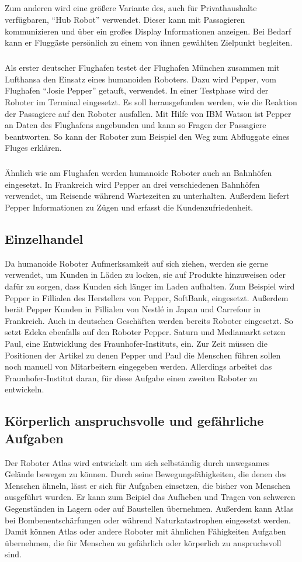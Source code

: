\subparagraph{}
Zum anderen wird eine größere Variante des, auch für Privathaushalte
verfügbaren, "`Hub Robot"' verwendet. Dieser kann mit Passagieren kommunizieren
und über ein großes Display Informationen anzeigen. Bei Bedarf kann er Fluggäste
persönlich zu einem von ihnen gewählten Zielpunkt begleiten.
\cite{Beineke2017}

\subparagraph{}
Als erster deutscher Flughafen testet der Flughafen München zusammen mit
Lufthansa den Einsatz eines humanoiden Roboters. Dazu wird Pepper, vom Flughafen
"`Josie Pepper"' getauft, verwendet. In einer Testphase wird der Roboter im
Terminal eingesetzt. Es soll herausgefunden werden, wie die Reaktion der
Passagiere auf den Roboter ausfallen. Mit Hilfe von IBM Watson ist Pepper an
Daten des Flughafens angebunden und kann so Fragen der Passagiere beantworten.
So kann der Roboter zum Beispiel den Weg zum Abfluggate eines Fluges erklären.
\cite{MunichAirport2018}

\subparagraph{}
Ähnlich wie am Flughafen werden humanoide Roboter auch an Bahnhöfen eingesetzt.
In Frankreich wird Pepper an drei verschiedenen Bahnhöfen verwendet, um Reisende
während Wartezeiten zu unterhalten. Außerdem liefert Pepper Informationen zu
Zügen und erfasst die Kundenzufriedenheit. \cite{SoftBankIV2018}

\subsection{Einzelhandel}
Da humanoide Roboter Aufmerksamkeit auf sich ziehen, werden sie gerne verwendet,
um Kunden in Läden zu locken, sie auf Produkte hinzuweisen oder dafür zu sorgen,
dass Kunden sich länger im Laden aufhalten. Zum Beispiel wird Pepper in
Fillialen des Herstellers von Pepper, SoftBank, eingesetzt. Außerdem berät
Pepper Kunden in Fillialen von Nestlé in Japan und Carrefour in Frankreich.
\cite{SoftBankIV2018} Auch in deutschen Geschäften werden bereits Roboter
eingesetzt. So setzt Edeka ebenfalls auf den Roboter Pepper. Saturn und
Mediamarkt setzen Paul, eine Entwicklung des Fraunhofer-Instituts, ein. Zur Zeit
müssen die Positionen der Artikel zu denen Pepper und Paul die Menschen führen
sollen noch manuell von Mitarbeitern eingegeben werden. Allerdings arbeitet das
Fraunhofer-Institut daran, für diese Aufgabe einen zweiten Roboter zu
entwickeln. \cite{Hildebrand2017}

\subsection{Körperlich anspruchsvolle und gefährliche Aufgaben}
Der Roboter Atlas wird entwickelt um sich selbständig durch unwegsames Gelände
bewegen zu können. Durch seine Bewegungsfähigkeiten, die denen des Menschen
ähneln, lässt er sich für Aufgaben einsetzen, die bisher von Menschen ausgeführt
wurden. Er kann zum Beipiel das Aufheben
und Tragen von schweren Gegenständen in Lagern oder auf Baustellen übernehmen.
Außerdem kann Atlas bei Bombenentschärfungen oder während Naturkatastrophen
eingesetzt werden. Damit können Atlas oder andere Roboter mit ähnlichen
Fähigkeiten Aufgaben übernehmen, die für Menschen zu gefährlich oder körperlich
zu anspruchsvoll sind. \cite{Kaczmarek2016}
